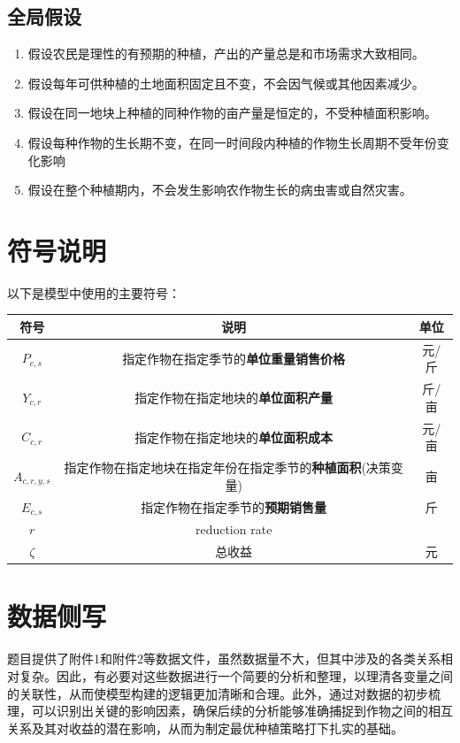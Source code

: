 \documentclass[withoutpreface]{cumcmthesis}
\begin{document}
\subsection{全局假设}
\begin{enumerate}
    \item 假设农民是理性的有预期的种植，产出的产量总是和市场需求大致相同。
    \item 假设每年可供种植的土地面积固定且不变，不会因气候或其他因素减少。
    \item 假设在同一地块上种植的同种作物的亩产量是恒定的，不受种植面积影响。
    \item 假设每种作物的生长期不变，在同一时间段内种植的作物生长周期不受年份变化影响
    \item 假设在整个种植期内，不会发生影响农作物生长的病虫害或自然灾害。
\end{enumerate}

\newpage
\section{符号说明}
以下是模型中使用的主要符号：
\begin{table}[H]
    \begin{tabular}{ccc}
        \toprule[1.5pt]
        符号 & 说明 & 单位\\
        \midrule[1pt]
        $P_{c,s}$ & 指定作物在指定季节的\textbf{单位重量销售价格} & 元/斤 \\
        $Y_{c,r}$ & 指定作物在指定地块的\textbf{单位面积产量} & 斤/亩\\
        $C_{c,r}$ & 指定作物在指定地块的\textbf{单位面积成本} & 元/亩\\
        $A_{c,r,y,s}$ & 指定作物在指定地块在指定年份在指定季节的\textbf{种植面积}(决策变量) & 亩\\
        $E_{c,s}$ & 指定作物在指定季节的\textbf{预期销售量} & 斤\\
        $r$ & reduction rate & \\
        
        $\zeta$ & 总收益 & 元\\
        \bottomrule[1.5pt]
    \end{tabular}
\end{table}
\newpage
\section{数据侧写}
题目提供了附件1和附件2等数据文件，虽然数据量不大，但其中涉及的各类关系相对复杂。因此，有必要对这些数据进行一个简要的分析和整理，以理清各变量之间的关联性，从而使模型构建的逻辑更加清晰和合理。此外，通过对数据的初步梳理，可以识别出关键的影响因素，确保后续的分析能够准确捕捉到作物之间的相互关系及其对收益的潜在影响，从而为制定最优种植策略打下扎实的基础。
\end{document}
